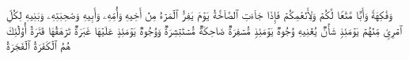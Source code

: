 \stopbuffer%
\startbuffer[\q:80:31]
وَفَٰكِهَةࣰ وَأَبࣰّا%
\stopbuffer%
\startbuffer[\q:80:32]
مَّتَٰعࣰا لَّكُمۡ وَلِأَنۡعَٰمِكُمۡ%
\stopbuffer%
\startbuffer[\q:80:33]
فَإِذَا جَاۤءَتِ ٱلصَّاۤخَّةُ%
\stopbuffer%
\startbuffer[\q:80:34]
یَوۡمَ یَفِرُّ ٱلۡمَرۡءُ مِنۡ أَخِیهِ%
\stopbuffer%
\startbuffer[\q:80:35]
وَأُمِّهِۦ وَأَبِیهِ%
\stopbuffer%
\startbuffer[\q:80:36]
وَصَٰحِبَتِهِۦ وَبَنِیهِ%
\stopbuffer%
\startbuffer[\q:80:37]
لِكُلِّ ٱمۡرِئࣲ مِّنۡهُمۡ یَوۡمَئِذࣲ شَأۡنࣱ یُغۡنِیهِ%
\stopbuffer%
\startbuffer[\q:80:38]
وُجُوهࣱ یَوۡمَئِذࣲ مُّسۡفِرَةࣱ%
\stopbuffer%
\startbuffer[\q:80:39]
ضَاحِكَةࣱ مُّسۡتَبۡشِرَةࣱ%
\stopbuffer%
\startbuffer[\q:80:40]
وَوُجُوهࣱ یَوۡمَئِذٍ عَلَیۡهَا غَبَرَةࣱ%
\stopbuffer%
\startbuffer[\q:80:41]
تَرۡهَقُهَا قَتَرَةٌ%
\stopbuffer%
\startbuffer[\q:80:42]
أُو۟لَٰۤئِكَ هُمُ ٱلۡكَفَرَةُ ٱلۡفَجَرَةُ%
\stopbuffer%
